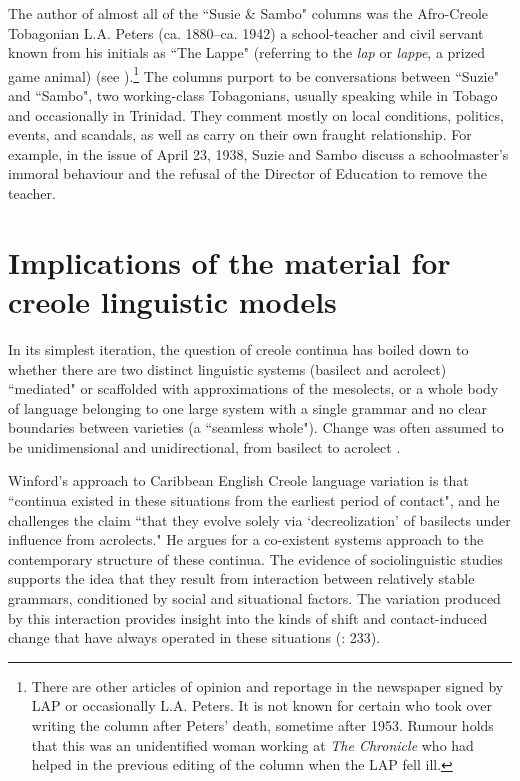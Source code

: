 \documentclass[output=paper,colorlinks,citecolor=brown]{langscibook}
\begin{document}
The author of almost all of the ``Susie \& Sambo" columns was the Afro-Creole Tobagonian L.A. Peters (ca. 1880--ca. 1942) a school-teacher and civil servant known from his initials as ``The Lappe" (referring to the \textit{lap} or \textit{lappe}, a prized game animal) (see \citealt[83--84]{craigjames2008}).\footnote{There are other articles of opinion and reportage in the newspaper signed by LAP or occasionally L.A. Peters.  It is not known for certain who took over writing the column after Peters’ death, sometime after 1953.  Rumour holds that this was an unidentified woman working at \textit{The Chronicle} who had helped in the previous editing of the column when the LAP fell ill.} The columns purport to be conversations between ``Suzie" and ``Sambo", two working-class Tobagonians, usually speaking while in Tobago and occasionally in Trinidad.  They comment mostly on local conditions, politics, events, and scandals, as well as carry on their own fraught relationship.  For example, in the issue of April 23,  1938,  Suzie and Sambo discuss a schoolmaster’s immoral behaviour and the refusal of the Director of Education to remove the teacher.

 
\section{Implications of the material for creole linguistic models}
\begin{sloppypar}
In its simplest iteration, the question of creole continua has boiled down to wheth\-er there are two distinct linguistic systems (basilect and acrolect) ``mediated" or scaffolded with approximations of the mesolects, or a whole body of language belonging to one large system with a single grammar and no clear boundaries between varieties (a ``seamless whole").  Change was often assumed to be unidimensional and unidirectional, from basilect to acrolect \citep[233]{Winford1997re-exam}.
\end{sloppypar}

Winford’s approach to Caribbean English Creole language variation is that ``continua existed in these situations from the earliest period of contact", and he challenges the claim ``that they evolve solely via ‘decreolization’ of basilects under influence from acrolects." He argues for a co-existent systems approach to the contemporary structure of these continua. The evidence of sociolinguistic studies supports the idea that they result from interaction between relatively stable grammars, conditioned by social and situational factors. The variation produced by this interaction provides insight into the kinds of shift and contact-induced change that have always operated in these situations (\citeyear{Winford1997re-exam}: 233).
\end{document}
